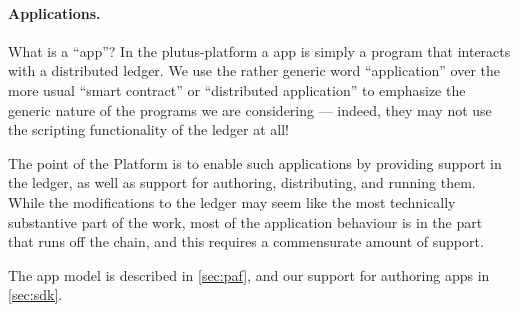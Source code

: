 \paragraph{Applications.}
What is a ``\gls{app}''?
In the \gls{plutus-platform} a \gls{app} is simply a program that interacts with a distributed ledger.
We use the rather generic word ``application'' over the more usual ``smart contract'' or ``distributed application'' to emphasize the generic nature of the programs we are considering --- indeed, they may not use the scripting functionality of the ledger at all!

The point of the Platform is to enable such applications by providing support in the ledger, as well as support for authoring, distributing, and running them.
While the modifications to the ledger may seem like the most technically substantive part of the work, most of the application behaviour is in the part that runs off the chain, and this requires a commensurate amount of support.

The \gls{app} model is described in \cref{sec:paf}, and our support for authoring \glspl{app} in \cref{sec:sdk}.
